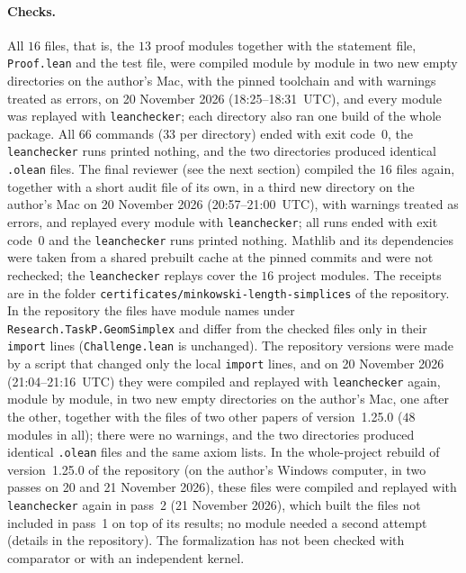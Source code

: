 \documentclass[11pt]{article}
\theoremstyle{definition}
\theoremstyle{remark}
\newcommand{\repoversion}{1.25.0}
\begin{document}
{\paragraph{Checks.}
All $16$ files, that is, the $13$ proof modules together with the
statement file, \texttt{Proof.lean} and the test file, were compiled module by
module in two new empty directories on the author's Mac, with the pinned
toolchain and with warnings treated as errors, on 20 November 2026
(18:25--18:31~UTC), and every module was replayed with \texttt{leanchecker};
each directory also ran one build of the whole package. All $66$ commands
($33$ per directory) ended with exit code~$0$, the \texttt{leanchecker} runs
printed nothing, and the two directories produced identical \texttt{.olean}
files. The final reviewer (see the next section) compiled the $16$ files again,
together with a short audit file of its own, in a third new directory on the
author's Mac on 20 November 2026 (20:57--21:00~UTC), with warnings treated as
errors, and replayed every module with \texttt{leanchecker}; all runs ended
with exit code~$0$ and the \texttt{leanchecker} runs printed nothing. Mathlib
and its dependencies were taken from a shared prebuilt cache at the pinned
commits and were not rechecked; the \texttt{leanchecker} replays cover the
$16$ project modules. The receipts are in the folder
\texttt{certificates/minkowski-length-simplices} of the repository. In the
repository the files have module names under
\texttt{Research.TaskP.GeomSimplex} and differ from the checked files only in
their \texttt{import} lines (\texttt{Challenge.lean} is unchanged).
The repository versions were made by a script that changed only the local \texttt{import} lines, and on 20 November 2026 (21:04--21:16~UTC) they were compiled and replayed with \texttt{leanchecker} again, module by module, in two new empty directories on the author's Mac, one after the other, together with the files of two other papers of version~\repoversion{} ($48$ modules in all); there were no warnings, and the two directories produced identical \texttt{.olean} files and the same axiom lists. In the whole-project rebuild of version~\repoversion{} of the repository (on the author's Windows computer, in two passes on 20 and 21 November 2026), these files were compiled and replayed with \texttt{leanchecker} again in pass~2 (21 November 2026), which built the files not included in pass~1 on top of its results; no module needed a second attempt (details in the repository). The formalization has not been checked with
comparator or with an independent kernel.

\par}
\end{document}
